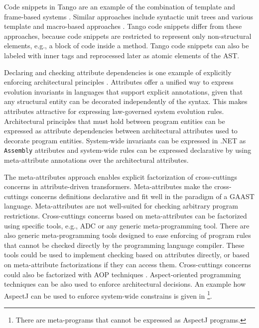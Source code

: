 Code snippets in Tango are an example of the combination of template and frame-based systems \cite{generative.00,voelter.generation}. Similar approaches include syntactic unit trees \cite{majkut.03} and various template and macro-based approaches \cite{java.epp,java.jse}. Tango code snippets differ from these approaches, because code snippets are restricted to represent only non-structural elements, e.g., a block of code inside a method. Tango code snippets can also be labeled with inner tags and reprocessed later as atomic elements of the AST.

Declaring and checking attribute dependencies is one example of explicitly enforcing architectural principles \cite{minsky.98}. Attributes offer a unified way to express evolution invariants in languages that support explicit annotations, given that any structural entity can be decorated independently of the syntax. This makes attributes attractive for expressing law-governed system evolution rules. Architectural principles that must hold between program entities can be expressed as attribute dependencies between architectural attributes used to decorate program entities. System-wide invariants can be expressed in .NET as \texttt{Asse\-mbly} attributes and system-wide rules can be expressed declarative by using meta-attribute annotations over the architectural attributes.

The meta-attributes approach enables explicit factorization of cross-cuttings concerns in attribute-driven transformers. Meta-attributes make the cross-cuttings concerns definitions declarative and fit well in the paradigm of a GAAST language. Meta-attributes are not well-suited for checking arbitrary program restrictions. Cross-cuttings concerns based on meta-attributes can be factorized using specific tools, e.g., ADC  or any generic me\-ta-pro\-gramming tool. There are also generic me\-ta-pro\-gramming tools \cite{www.pmd,www.tj,XIRC} designed to ease enforcing of program rules that cannot be checked directly by the programming language compiler. These tools could be used to implement checking based on attributes directly, or based on meta-attribute factorizations if they can access them. Cross-cuttings concerns could also be factorized with AOP \cite{kiczalesetal.97,Laddad.aop,XIRC,aop.attrib.05} techniques . Aspect-oriented programming techniques can be also used to enforce architectural decisions. An example how AspectJ \cite{www.aspectjt} can be used to enforce system-wide constrains is given in \cite{shomrat.01}\footnote{There are meta-programs that cannot be expressed as AspectJ programs.}. 

